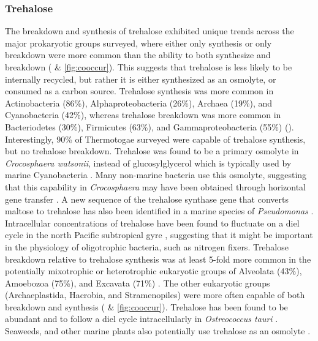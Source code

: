 \documentclass[utf8]{frontiersSCNS} %
\begin{document}
\subsubsection*{Trehalose}
The breakdown and synthesis of trehalose exhibited unique trends across the major prokaryotic groups surveyed, where either only synthesis or only breakdown were more common than the ability to both synthesize and breakdown ( \& \ref{fig:cooccur}). This suggests that trehalose is less likely to be internally recycled, but rather it is either synthesized as an osmolyte, or consumed as a carbon source. Trehalose synthesis was more common in Actinobacteria (86\%), Alphaproteobacteria (26\%), Archaea (19\%), and Cyanobacteria (42\%), whereas trehalose breakdown was more common in Bacteriodetes (30\%), Firmicutes (63\%), and Gammaproteobacteria (55\%) (). Interestingly, 90\% of Thermotogae surveyed were capable of trehalose synthesis, but no trehalose breakdown. Trehalose was found to be a primary osmolyte in \emph{Crocosphaera watsonii}, instead of glucosylglycerol which is typically used by marine Cyanobacteria \citep{Pade2012}. Many non-marine bacteria use this osmolyte, suggesting that this capability in \emph{Crocosphaera} may have been obtained through horizontal gene transfer \citep{Pade2012}. A new sequence of the trehalose synthase gene that converts maltose to trehalose has also been identified in a marine species of \emph{Pseudomonas} \citep{Gao2013}. Intracellular concentrations of trehalose have been found to fluctuate on a diel cycle in the north Pacific subtropical gyre \citep{Boysen2020}, suggesting that it might be important in the physiology of oligotrophic bacteria, such as nitrogen fixers. Trehalose breakdown relative to trehalose synthesis was at least 5-fold more common in the potentially mixotrophic or heterotrophic eukaryotic groups of Alveolata (43\%), Amoebozoa (75\%), and Excavata (71\%) . The other eukaryotic groups (Archaeplastida, Hacrobia, and Stramenopiles) were more often capable of both breakdown and synthesis ( \& \ref{fig:cooccur}). Trehalose has been found to be abundant and to follow a diel cycle intracellularly in \emph{Ostreococcus tauri} \citep{Hirth2017}. Seaweeds, and other marine plants also potentially use trehalose as an osmolyte \citep{Xuan2012,Danaraj2020}.
\end{document}
